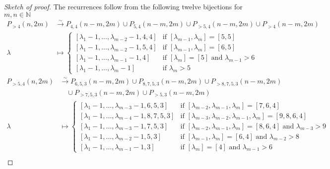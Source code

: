 \documentclass[12pt, reqno]{amsart}
\theoremstyle{remark}
\begin{document}
\begin{proof}[Sketch of proof]
  The recurrences follow from the following twelve bijections for $m, n \in \mathbb{N}$
  \begin{align*}
    P_{>4}(n, 2m) &\xrightarrow{\sim} P_{4, 4}(n - m, 2m) \cup P_{5, 4}(n - m, 2m) \cup P_{>5, 4}(n - m, 2m) \cup P_{>4}(n - m, 2m) \\
    \lambda &\mapsto
              \begin{cases}
                [\lambda_1 - 1, \dots, \lambda_{m - 2} - 1, 4, 4] &\text{if }[\lambda_{m - 1}, \lambda_m] = [5, 5] \\
                [\lambda_1 - 1, \dots, \lambda_{m - 2} - 1, 5, 4] &\text{if }[\lambda_{m - 1}, \lambda_m] = [6, 5] \\
                [\lambda_1 - 1, \dots, \lambda_{m - 1} - 1, 4] &\text{if }[\lambda_m] = [5]\text{ and }\lambda_{m - 1} > 6 \\
                [\lambda_1 - 1, \dots, \lambda_m - 1] &\text{if }\lambda_m > 5
              \end{cases}
  \end{align*}
  \begin{align*}
    P_{>5, 4}(n, 2m) &\xrightarrow{\sim} P_{6, 5, 3}(n - m, 2m) \cup P_{8, 7, 5, 3}(n - m, 2m) \cup P_{>8, 7, 5, 3}(n - m, 2m)\\
    &\quad \cup P_{>7, 5, 3}(n - m, 2m) \cup P_{>5, 3}(n - m, 2m) \\
    \lambda &\mapsto
              \begin{cases}
                [\lambda_1 - 1, \dots, \lambda_{m - 3} - 1, 6, 5, 3] &\text{if }[\lambda_{m - 2}, \lambda_{m - 1}, \lambda_m] = [7, 6, 4] \\
                [\lambda_1 - 1, \dots, \lambda_{m - 4} - 1, 8, 7, 5, 3] &\text{if }[\lambda_{m - 3}, \lambda_{m - 2}, \lambda_{m - 1}, \lambda_m] = [9, 8, 6, 4] \\
                [\lambda_1 - 1, \dots, \lambda_{m - 3} - 1, 7, 5, 3] &\text{if }[\lambda_{m - 2}, \lambda_{m - 1}, \lambda_m] = [8, 6, 4]\text{ and }\lambda_{m - 3} > 9 \\
                [\lambda_1 - 1, \dots, \lambda_{m - 2} - 1, 5, 3] &\text{if }[\lambda_{m - 1}, \lambda_m] = [6, 4]\text{ and }\lambda_{m - 2} > 8 \\
                [\lambda_1 - 1, \dots, \lambda_{m - 1} -1, 3] &\text{if }[\lambda_m] = [4]\text{ and }\lambda_{m - 1} > 6
              \end{cases}
  \end{align*}
  \begin{align*}

\end{align*}
\end{proof}
\end{document}
